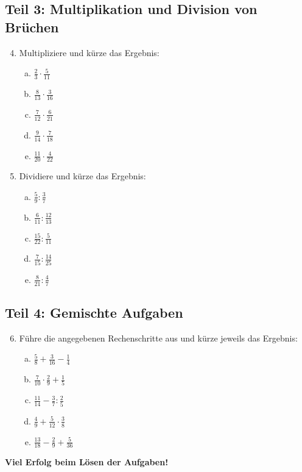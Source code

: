 \subsection*{Teil 3: Multiplikation und Division von Brüchen}
\begin{enumerate}
    \setcounter{enumi}{3}
    \item Multipliziere und kürze das Ergebnis:
    \begin{enumerate}[a)]
        \item $\frac{2}{3} \cdot \frac{5}{11}$
        \item $\frac{8}{13} \cdot \frac{3}{16}$
        \item $\frac{7}{12} \cdot \frac{6}{21}$
        \item $\frac{9}{14} \cdot \frac{7}{18}$
        \item $\frac{11}{20} \cdot \frac{4}{22}$
    \end{enumerate}
    \item Dividiere und kürze das Ergebnis:
    \begin{enumerate}[a)]
        \item $\frac{5}{9} : \frac{3}{7}$
        \item $\frac{6}{11} : \frac{12}{13}$
        \item $\frac{15}{22} : \frac{5}{11}$
        \item $\frac{7}{15} : \frac{14}{25}$
        \item $\frac{8}{21} : \frac{4}{7}$
    \end{enumerate}
\end{enumerate}

\subsection*{Teil 4: Gemischte Aufgaben}
\begin{enumerate}
    \setcounter{enumi}{5}
    \item Führe die angegebenen Rechenschritte aus und kürze jeweils das Ergebnis:
    \begin{enumerate}[a)]
        \item $\frac{5}{8} + \frac{3}{16} - \frac{1}{4}$
        \item $\frac{7}{10} \cdot \frac{2}{9} + \frac{1}{5}$
        \item $\frac{11}{14} - \frac{3}{7} : \frac{2}{5}$
        \item $\frac{4}{9} + \frac{5}{12} \cdot \frac{3}{8}$
        \item $\frac{13}{18} - \frac{2}{9} + \frac{5}{36}$
    \end{enumerate}
\end{enumerate}

\vspace{1cm}
\textbf{Viel Erfolg beim Lösen der Aufgaben!}
